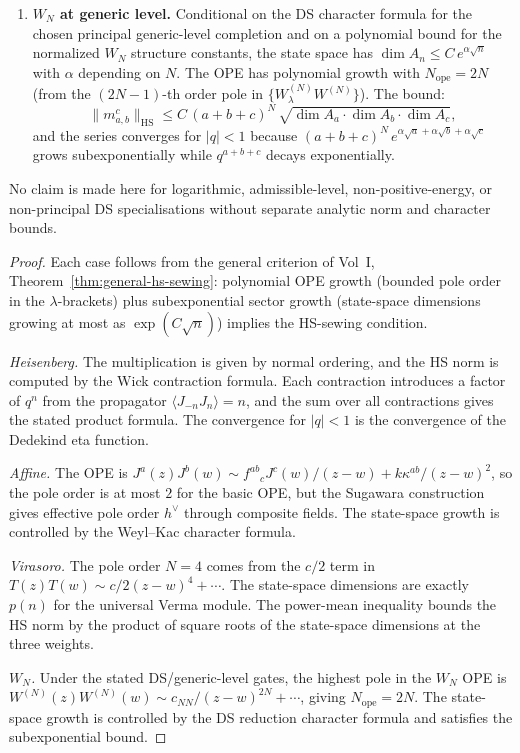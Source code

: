 \begin{theorem}
\begin{enumerate}[leftmargin=2.4em]
\item \textbf{$W_N$ at generic level.}
Conditional on the DS character formula for the chosen principal
generic-level completion and on a polynomial bound for the normalized
$W_N$ structure constants, the state space has
$\dim A_n \le C\,e^{\alpha\sqrt{n}}$ with $\alpha$ depending on $N$.
The OPE has polynomial growth with $N_{\mathrm{ope}} = 2N$
(from the $(2N-1)$-th order pole in
$\{W^{(N)}_\lambda W^{(N)}\}$).
The bound:
\[
\|m_{a,b}^c\|_{\mathrm{HS}}
\le
C\,(a+b+c)^N\,\sqrt{\dim A_a \cdot \dim A_b \cdot \dim A_c},
\]
and the series converges for $|q|<1$ because
$(a+b+c)^N\,e^{\alpha\sqrt{a}+\alpha\sqrt{b}+\alpha\sqrt{c}}$
grows subexponentially while $q^{a+b+c}$ decays exponentially.
\end{enumerate}
No claim is made here for logarithmic, admissible-level,
non-positive-energy, or non-principal DS specialisations without
separate analytic norm and character bounds.
\end{theorem}

\begin{proof}
Each case follows from the general criterion of
Vol~I, Theorem~\ref*{thm:general-hs-sewing}:
polynomial OPE growth (bounded pole order in the $\lambda$-brackets)
plus subexponential sector growth (state-space dimensions growing at most
as $\exp(C\sqrt{n})$) implies the HS-sewing condition.

\emph{Heisenberg.} The multiplication is given by normal ordering, and the
HS norm is computed by the Wick contraction formula. Each contraction
introduces a factor of $q^n$ from the propagator $\langle J_{-n} J_n\rangle
= n$, and the sum over all contractions gives the stated product formula.
The convergence for $|q| < 1$ is the convergence of the Dedekind eta
function.

\emph{Affine.} The OPE is $J^a(z)J^b(w) \sim
f^{ab}{}_c J^c(w)/(z-w) + k\kappa^{ab}/(z-w)^2$, so the pole order
is at most $2$ for the basic OPE, but the Sugawara construction gives
effective pole order $h^\vee$ through composite fields. The state-space
growth is controlled by the Weyl--Kac character formula.

\emph{Virasoro.} The pole order $N=4$ comes from the $c/2$ term in
$T(z)T(w) \sim c/2(z-w)^4 + \cdots$. The state-space dimensions are
exactly $p(n)$ for the universal Verma module. The power-mean inequality
bounds the HS norm by the product of square roots of the state-space
dimensions at the three weights.

\emph{$W_N$.} Under the stated DS/generic-level gates, the highest pole
in the $W_N$ OPE is
$W^{(N)}(z)W^{(N)}(w) \sim c_{NN}/(z-w)^{2N} + \cdots$, giving
$N_{\mathrm{ope}} = 2N$. The state-space growth is controlled by the
DS reduction character formula and satisfies the subexponential bound.
\end{proof}

